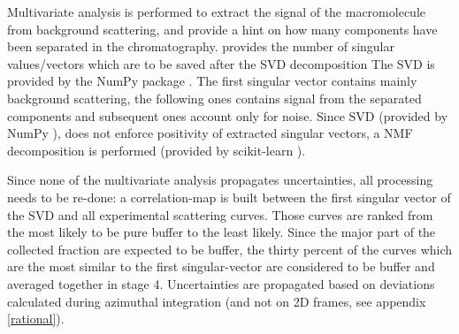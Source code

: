 \documentclass[preprint]{iucr}              %
\begin{document}
Multivariate analysis is performed to extract the signal of the macromolecule from background scattering, and provide a hint on how many components have been separated in the chromatography.
 provides the number of singular values/vectors which are to be saved after the SVD decomposition
The SVD is provided by the NumPy package \cite{numpy}.   
The first singular vector contains mainly background scattering, the following ones contains signal from the separated components and subsequent ones account only for noise.
Since SVD (provided by NumPy \cite{numpy}), does not enforce positivity of extracted singular vectors, a NMF decomposition is performed (provided by scikit-learn \cite{sklearn}).


Since none of the multivariate analysis propagates uncertainties, all processing needs to be re-done:
a correlation-map is built between the first singular vector of the SVD and all experimental scattering curves. 
Those curves are ranked from the most likely to be pure buffer to the least likely. 
Since the major part of the collected fraction are expected to be buffer, the thirty percent of the curves which are the most similar to the first singular-vector are considered to be buffer and averaged together in stage 4.
Uncertainties are propagated based on deviations calculated during azimuthal integration (and not on 2D frames, see appendix \ref{rational}).
\end{document}
